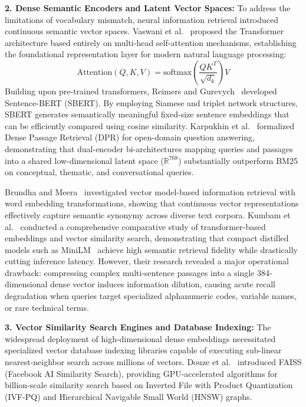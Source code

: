 \documentclass[a4paper,12pt]{article}
\begin{document}
\vspace{0.8em}
\noindent\textbf{2. Dense Semantic Encoders and Latent Vector Spaces:}
To address the limitations of vocabulary mismatch, neural information retrieval introduced continuous semantic vector spaces. Vaswani et al.~\cite{vaswani2017attention} proposed the Transformer architecture based entirely on multi-head self-attention mechanisms, establishing the foundational representation layer for modern natural language processing:
\begin{equation}
\text{Attention}(Q, K, V) = \text{softmax}\left(\frac{QK^T}{\sqrt{d_k}}\right)V
\end{equation}
Building upon pre-trained transformers, Reimers and Gurevych~\cite{reimers2019sentence} developed Sentence-BERT (SBERT). By employing Siamese and triplet network structures, SBERT generates semantically meaningful fixed-size sentence embeddings that can be efficiently compared using cosine similarity. Karpukhin et al.~\cite{karpukhin2020dense} formalized Dense Passage Retrieval (DPR) for open-domain question answering, demonstrating that dual-encoder bi-architectures mapping queries and passages into a shared low-dimensional latent space ($\mathbb{R}^{768}$) substantially outperform BM25 on conceptual, thematic, and conversational queries.

Brundha and Meera~\cite{brundha2022vector} investigated vector model-based information retrieval with word embedding transformations, showing that continuous vector representations effectively capture semantic synonymy across diverse text corpora. Kumbam et al.~\cite{vnrk2025semantic} conducted a comprehensive comparative study of transformer-based embeddings and vector similarity search, demonstrating that compact distilled models such as MiniLM~\cite{wang2020minilm} achieve high semantic retrieval fidelity while drastically cutting inference latency. However, their research revealed a major operational drawback: compressing complex multi-sentence passages into a single 384-dimensional dense vector induces information dilution, causing acute recall degradation when queries target specialized alphanumeric codes, variable names, or rare technical terms.

\vspace{0.8em}
\noindent\textbf{3. Vector Similarity Search Engines and Database Indexing:}
The widespread deployment of high-dimensional dense embeddings necessitated specialized vector database indexing libraries capable of executing sub-linear nearest-neighbor search across millions of vectors. Douze et al.~\cite{douze2024faiss} introduced FAISS (Facebook AI Similarity Search), providing GPU-accelerated algorithms for billion-scale similarity search based on Inverted File with Product Quantization (IVF-PQ) and Hierarchical Navigable Small World (HNSW) graphs. 
\end{document}
